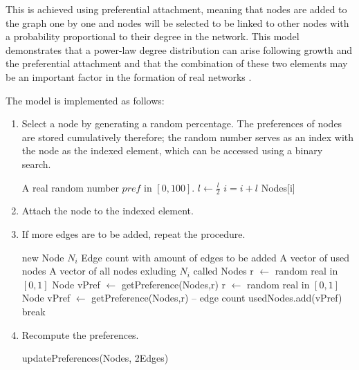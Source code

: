 \documentclass[a4paper,11pt,titlepage]{article}
\begin{document}
This is achieved using preferential attachment, meaning that nodes are added to
the graph one by one and nodes will be selected to be linked to other nodes with
a probability proportional to their degree in the network. This model
demonstrates that a power-law degree distribution can arise following growth and
the preferential attachment and that the combination of these two elements may
be an important factor in the formation of real networks \cite{oconn11}.

The model is implemented as follows:


\begin{enumerate}
\item
  Select a node by generating a random percentage. The preferences of nodes are
  stored cumulatively therefore; the random number serves as an index with the
  node as the indexed element, which can be accessed using a binary search.
  \begin{algorithmic}
    \REQUIRE A real random number $pref$ in $[0,100]$.
        \STATE $l \gets \frac{l}{2}$
            \STATE $i = i+l$
          \ENDIF
        \ENDIF
      \ENDFOR
    \ENDFOR
    \RETURN Nodes[i]
  \end{algorithmic}

  \item Attach the node to the indexed element.

  \item If more edges are to be added, repeat the procedure.
  \begin{algorithmic}
    \REQUIRE  new Node $N_i$
    \REQUIRE Edge count with amount of edges to be added
    \REQUIRE A vector of used nodes
    \REQUIRE A vector of all nodes exluding $N_i$ called Nodes
      \STATE r $\gets$ random real in $[0, 1]$
      \STATE Node vPref $\gets$ getPreference(Nodes,r)
        \STATE r $\gets$ random real in $[0, 1]$
        \STATE Node vPref $\gets$ getPreference(Nodes,r)
      \ENDWHILE
      \STATE -- edge count
      \STATE usedNodes.add(vPref)
        \STATE break
      \ENDIF
    \ENDWHILE
  \end{algorithmic}

  \item Recompute the preferences.
  \begin{algorithmic}
    \STATE updatePreferences(Nodes, 2Edges)
  \end{algorithmic}
\end{enumerate}
\end{document}
